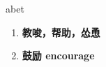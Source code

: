 
\begin{frame}
{\huge abet}
\begin{center}
\begin{enumerate}\Large
  \item \textbf{教唆，帮助，怂恿}
  \item \textbf{鼓励 encourage}
\end{enumerate}
\end{center}
\end{frame}
